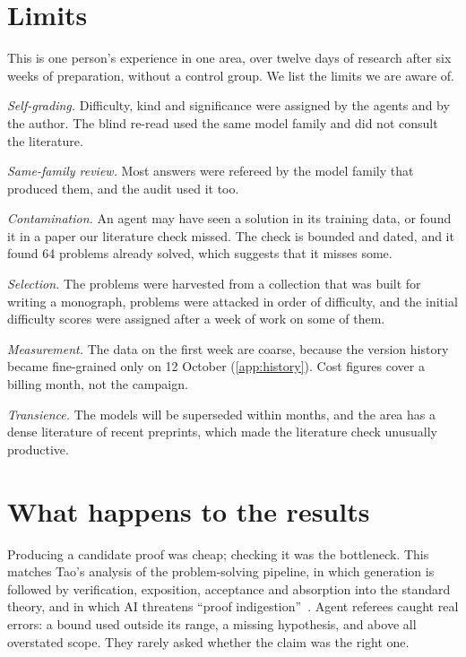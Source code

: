 \documentclass[11pt]{amsart}
\newcommand*{\sectionbreak}{\clearpage} %
\begin{document}
\sectionbreak
\section{Limits}\label{sec:limits}

This is one person's experience in one area, over twelve days of research after
six weeks of preparation, without a control group. We list the limits we are
aware of.\@

\emph{Self-grading.} Difficulty, kind and significance were assigned by the
agents and by the author. The blind re-read used the same model family and did
not consult the literature.\@

\emph{Same-family review.} Most answers were refereed by the model family that
produced them, and the audit used it too.\@

\emph{Contamination.} An agent may have seen a solution in its training data,
or found it in a paper our literature check missed. The check is bounded and
dated, and it found 64 problems already solved, which suggests that it misses
some.\@

\emph{Selection.} The problems were harvested from a collection that was built
for writing a monograph, problems were attacked in order of difficulty, and the
initial difficulty scores were assigned after a week of work on some of them.\@

\emph{Measurement.} The data on the first week are coarse, because the version
history became fine-grained only on 12 October (\cref{app:history}). Cost
figures cover a billing month, not the campaign.\@

\emph{Transience.} The models will be superseded within months, and the area
has a dense literature of recent preprints, which made the literature check
unusually productive.

\sectionbreak
\section{What happens to the results}\label{sec:next}

Producing a candidate proof was cheap; checking it was the bottleneck. This
matches Tao's analysis of the problem-solving pipeline, in which generation is
followed by verification, exposition, acceptance and absorption into the
standard theory, and in which AI threatens ``proof
indigestion''~\cite{tao-age}. Agent referees caught real errors: a bound used
outside its range, a missing hypothesis, and above all overstated scope. They
rarely asked whether the claim was the right one.
\end{document}
